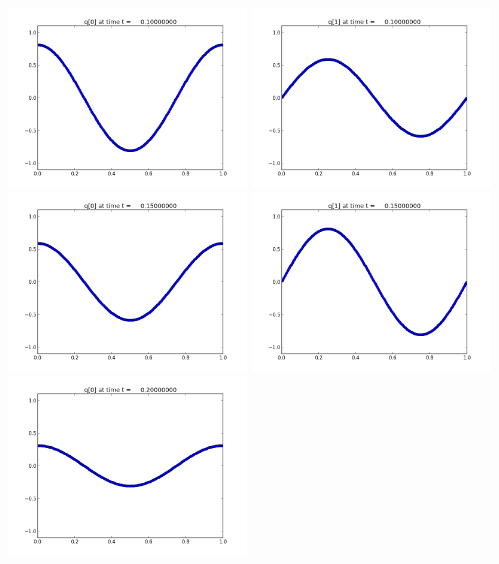 \documentclass[11pt]{article}
\begin{document}
\includegraphics[width=0.475\textwidth]{frame0002fig0.png}
\includegraphics[width=0.475\textwidth]{frame0002fig1.png}
\vskip 10pt 
\includegraphics[width=0.475\textwidth]{frame0003fig0.png}
\includegraphics[width=0.475\textwidth]{frame0003fig1.png}
\vskip 10pt 
\includegraphics[width=0.475\textwidth]{frame0004fig0.png}
\end{document}
